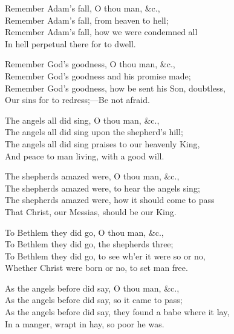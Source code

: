 \settowidth{\versewidth}{Remember God’s goodness, how be sent his Son, doubtless,}
\begin{dcverse}\footnotesizerr
\begin{altverse}
Remember Adam’s fall, O thou man, \&c.,\\
Remember Adam’s fall, from heaven to hell;\\
Remember Adam’s fall, how we were condemned all\\
In hell perpetual there for to dwell.
\end{altverse}

\begin{altverse}
Remember God’s goodness, O thou man, \&c.,\\
Remember God’s goodness and his promise made;\\
Remember God’s goodness, how be sent his Son, doubtless,\\
Our sins for to redress;—Be not afraid.
\end{altverse}

\begin{altverse}
The angels all did sing, O thou man, \&c.,\\
The angels all did sing upon the shepherd’s hill;\\
The angels all did sing praises to our heavenly King,\\
And peace to man living, with a good will.
\end{altverse}

\begin{altverse}
The shepherds amazed were, O thou man, \&c.,\\
The shepherds amazed were, to hear the angels sing;\\
The shepherds amazed were, how it should  come to pass\\
That Christ, our Messias, should be our King.
\end{altverse}

\begin{altverse}
To Bethlem they did go, O thou man, \&c.,\\
To Bethlem they did go, the shepherds three;\\
To Bethlem they did go, to see wh’er it were so or no,\\
Whether Christ were born or no, to set man free.
\end{altverse}

\begin{altverse}
As the angels before did say, O thou man, \&c.,\\
As the angels before did say, so it came to pass;\\
As the angels before did say, they found a babe where it lay,\\
In a manger, wrapt in hay, so poor he was.
\end{altverse}


\end{dcverse}
